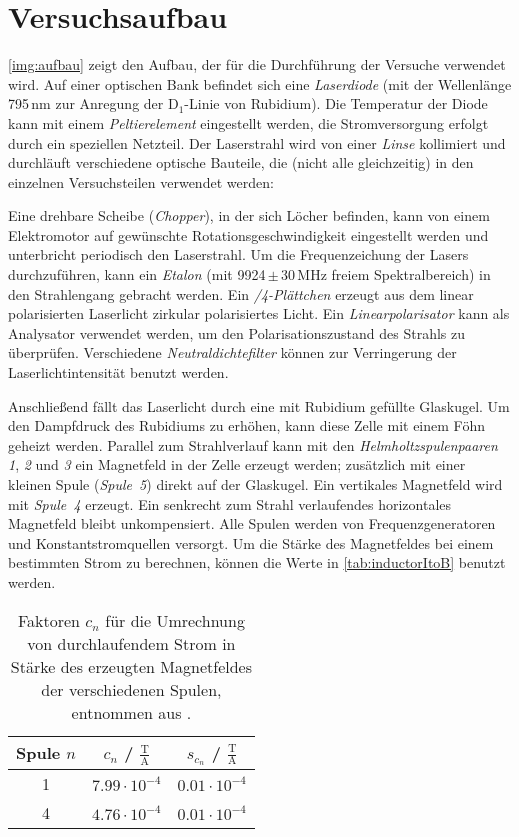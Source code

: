 \section{Versuchsaufbau}
\autoref{img:aufbau} zeigt den Aufbau, der für die Durchführung der Versuche
verwendet wird.
Auf einer optischen Bank befindet sich eine \emph{Laserdiode} (mit der Wellenlänge
795\,nm zur Anregung der D$_1$-Linie von Rubidium).
Die Temperatur der Diode kann mit einem \emph{Peltierelement} eingestellt werden,
die Stromversorgung erfolgt durch ein speziellen Netzteil.
Der Laserstrahl wird von einer \emph{Linse} kollimiert und durchläuft verschiedene
optische Bauteile, die (nicht alle gleichzeitig) in den einzelnen Versuchsteilen
verwendet werden:

Eine drehbare Scheibe (\emph{Chopper}), in der sich Löcher befinden, kann von
einem Elektromotor auf gewünschte Rotationsgeschwindigkeit eingestellt werden und unterbricht periodisch
den Laserstrahl.
Um die Fre\-quenz\-eich\-ung der Lasers durchzuführen, kann ein \emph{Etalon}
(mit 9924\,$\pm$\,30\,MHz freiem Spektralbereich) in den Strahlengang gebracht werden.
Ein \emph{\textlambda/4-Plättchen} erzeugt aus dem linear polarisierten Laserlicht zirkular polarisiertes Licht.
Ein \emph{Linearpolarisator} kann als Analysator verwendet werden, um den Polarisationszustand
des Strahls zu überprüfen. Verschiedene \emph{Neutraldichtefilter} können zur Verringerung der Laserlichtintensität
benutzt werden.

Anschließend fällt das Laserlicht durch eine mit Rubidium gefüllte Glaskugel.
Um den Dampfdruck des Rubidiums zu erhöhen, kann diese Zelle mit einem Föhn geheizt werden.
Parallel zum Strahlverlauf kann mit den \emph{Helmholtzspulenpaaren 1}, \emph{2} und \emph{3}
ein Magnetfeld in der Zelle erzeugt werden;
zusätzlich mit einer kleinen Spule (\emph{Spule~5}) direkt auf der Glaskugel.
Ein vertikales Magnetfeld wird mit \emph{Spule~4} erzeugt.
Ein senkrecht zum Strahl verlaufendes horizontales Magnetfeld bleibt unkompensiert.
Alle Spulen werden von Frequenzgeneratoren und Konstantstromquellen versorgt.
Um die Stärke des Magnetfeldes bei einem bestimmten Strom zu berechnen, können die Werte in \autoref{tab:inductorItoB} benutzt werden.
\begin{table}[H]
\caption{Faktoren $c_n$ für die Umrechnung von durchlaufendem Strom in Stärke des erzeugten Magnetfeldes der verschiedenen Spulen, 
		 entnommen aus \cite{manual}.}
\begin{center}
\begin{tabular}{|c|c|c|}
    \hline
    Spule $n$	& $c_n$ / $\frac{\text{T}}{\text{A}}$	& $s_{c_n}$ / $\frac{\text{T}}{\text{A}}$	\\ \hline
    1			& $7.99 \cdot 10^{-4}$					& $0.01 \cdot 10^{-4}$						\\ \hline
    4			& $4.76 \cdot 10^{-4}$					& $0.01 \cdot 10^{-4}$						\\ \hline
\end{tabular}
\end{center}
\label{tab:inductorItoB}
\end{table}


